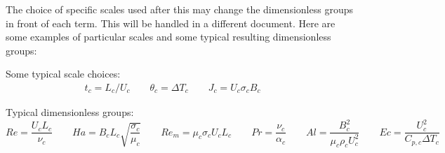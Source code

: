 \documentclass[11pt]{article}
\begin{document}
The choice of specific scales used after this may change the dimensionless groups in front of each term. This will be handled in a different document. Here are some examples of particular scales and some typical resulting dimensionless groups:

Some typical scale choices:
\begin{equation}\begin{aligned}
	t_c = L_c/ U_c \qquad
	\theta_c = \Delta T_c \qquad
	J_c = U_c \sigma_c B_c \qquad
\end{aligned}\end{equation}

Typical dimensionless groups:
\begin{equation}
	Re = \frac{U_c L_c}{\nu_c} \qquad
	Ha = B_c L_c \sqrt{\frac{\sigma_c}{\mu_c}} \qquad
	Re_m = \mu_c \sigma_c U_c L_c \qquad
	Pr = \frac{\nu_c}{\alpha_c} \qquad
	Al = \frac{B_c^2}{\mu_c \rho_c U_c^2} \qquad
	Ec = \frac{U_c^2}{C_{p,c} \Delta T_c} \qquad
\end{equation}
\end{document}
